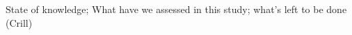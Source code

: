 \documentclass[PICOReport.tex]{subfiles}
\begin{document}
State of knowledge; What have we assessed in this study; what's left to be done (Crill)
\end{document}

